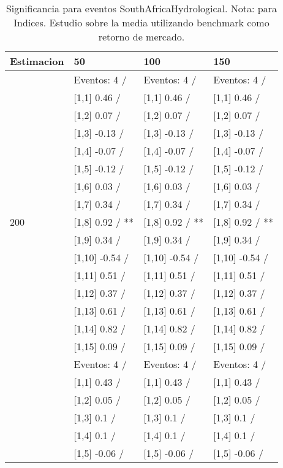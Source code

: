 \begin{table}

\caption{Significancia para eventos SouthAfricaHydrological. Nota: para Indices. Estudio sobre la media utilizando benchmark como retorno de mercado.}
\centering
\begin{tabular}[t]{llll}
\toprule
Estimacion & 50 & 100 & 150\\
\midrule
 & Eventos:  4 / & Eventos:  4 / & Eventos:  4 /\\
 & {}[1,1] 0.46  / & {}[1,1] 0.46  / & {}[1,1] 0.46  /\\
 & {}[1,2] 0.07  / & {}[1,2] 0.07  / & {}[1,2] 0.07  /\\
 & {}[1,3] -0.13  / & {}[1,3] -0.13  / & {}[1,3] -0.13  /\\
 & {}[1,4] -0.07  / & {}[1,4] -0.07  / & {}[1,4] -0.07  /\\
\addlinespace
 & {}[1,5] -0.12  / & {}[1,5] -0.12  / & {}[1,5] -0.12  /\\
 & {}[1,6] 0.03  / & {}[1,6] 0.03  / & {}[1,6] 0.03  /\\
 & {}[1,7] 0.34  / & {}[1,7] 0.34  / & {}[1,7] 0.34  /\\
200 & {}[1,8] 0.92  / ** & {}[1,8] 0.92  / ** & {}[1,8] 0.92  / **\\
 & {}[1,9] 0.34  / & {}[1,9] 0.34  / & {}[1,9] 0.34  /\\
\addlinespace
 & {}[1,10] -0.54  / & {}[1,10] -0.54  / & {}[1,10] -0.54  /\\
 & {}[1,11] 0.51  / & {}[1,11] 0.51  / & {}[1,11] 0.51  /\\
 & {}[1,12] 0.37  / & {}[1,12] 0.37  / & {}[1,12] 0.37  /\\
 & {}[1,13] 0.61  / & {}[1,13] 0.61  / & {}[1,13] 0.61  /\\
 & {}[1,14] 0.82  / & {}[1,14] 0.82  / & {}[1,14] 0.82  /\\
\addlinespace
 & {}[1,15] 0.09  / & {}[1,15] 0.09  / & {}[1,15] 0.09  /\\
 & Eventos:  4 / & Eventos:  4 / & Eventos:  4 /\\
 & {}[1,1] 0.43  / & {}[1,1] 0.43  / & {}[1,1] 0.43  /\\
 & {}[1,2] 0.05  / & {}[1,2] 0.05  / & {}[1,2] 0.05  /\\
 & {}[1,3] 0.1  / & {}[1,3] 0.1  / & {}[1,3] 0.1  /\\
\addlinespace
 & {}[1,4] 0.1  / & {}[1,4] 0.1  / & {}[1,4] 0.1  /\\
 & {}[1,5] -0.06  / & {}[1,5] -0.06  / & {}[1,5] -0.06  /\\

\end{tabular}
\end{table}
